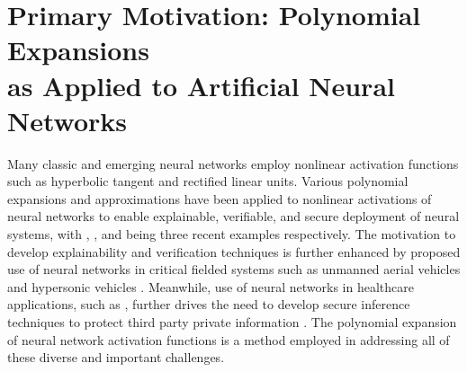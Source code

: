 \section[Primary Motivation: Polynomials Applied to Neural Networks]{Primary Motivation: Polynomial Expansions\\as Applied to Artificial Neural Networks}

\label{sec_motivation_neural_nets}

Many classic and emerging neural networks employ nonlinear activation functions such as hyperbolic tangent and rectified linear units. Various polynomial expansions and approximations have been applied to nonlinear activations of neural networks to enable explainable, verifiable, and secure deployment of neural systems, with \cite{montavon_explaining_2017}, \cite{dutta_reachability_2019}, and \cite{obla_effective_2020} being three recent examples respectively.  The motivation to develop explainability and verification techniques is further enhanced by proposed use of neural networks in critical fielded systems such as unmanned aerial vehicles \cite{lai_adaptive_2016,nodland_neural_2013} and hypersonic vehicles \cite{xu_dob-based_2017}.  Meanwhile, use of neural networks in healthcare applications, such as \cite{shen_deep_2019}, further drives the need to develop secure inference techniques to protect third party private information \cite{kwabena_mscryptonet:_2019,obla_effective_2020}.  The polynomial expansion of neural network activation functions is a method employed in addressing all of these diverse and important challenges.


